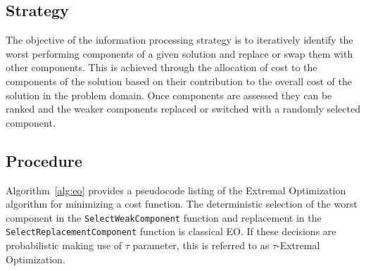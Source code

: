\subsection{Strategy}
The objective of the information processing strategy is to iteratively identify the worst performing components of a given solution and replace or swap them with other components.
This is achieved through the allocation of cost to the components of the solution based on their contribution to the overall cost of the solution in the problem domain. Once components are assessed they can be ranked and the weaker components replaced or switched with a randomly selected component.

\subsection{Procedure}
Algorithm~\ref{alg:eo} provides a pseudocode listing of the Extremal Optimization algorithm for minimizing a cost function. The deterministic selection of the worst component in the \texttt{Select\-Weak\-Component} function and replacement in the \texttt{Select\-Replacement\-Component} function is classical EO. If these decisions are probabilistic making use of $\tau$ parameter, this is referred to as $\tau$-Extremal Optimization.

